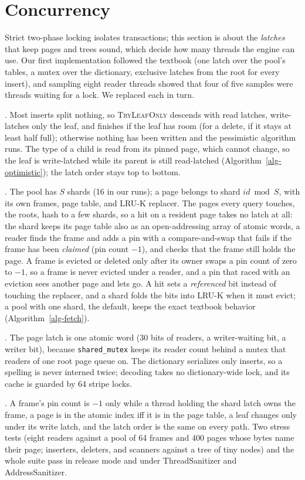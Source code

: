 \section{Concurrency}
\label{sec-conc}

Strict two-phase locking isolates transactions; this section is about the
\emph{latches} that keep pages and trees sound, which decide how many threads the
engine can use.
Our first implementation followed the textbook (one latch over the pool's
tables, a mutex over the dictionary, exclusive latches from the root for every
insert), and sampling eight reader threads showed that four of five samples were
threads waiting for a lock.
We replaced each in turn.

.
Most inserts split nothing, so \textsc{TryLeafOnly} descends with read
latches, write-latches only the leaf, and finishes if the leaf has room (for a
delete, if it stays at least half full); otherwise nothing has been written and
the pessimistic algorithm runs.
The type of a child is read from its pinned page, which cannot change, so the
leaf is write-latched while its parent is still read-latched
(Algorithm~\ref{alg-optimistic}); the latch order stays top to bottom.

.
The pool has $S$ shards (16 in our runs); a page belongs to shard $\mathit{id}
\bmod S$, with its own frames, page table, and LRU-K replacer.
The pages every query touches, the roots, hash to a few shards, so a hit on a
resident page takes no latch at all: the shard keeps its page table also as an
open-addressing array of atomic words, a reader finds the frame and adds a pin
with a compare-and-swap that fails if the frame has been \emph{claimed} (pin
count $-1$), and checks that the frame still holds the page.
A frame is evicted or deleted only after its owner swaps a pin count of zero to
$-1$, so a frame is never evicted under a reader, and a pin that raced with an
eviction sees another page and lets go.
A hit sets a \emph{referenced} bit instead of touching the replacer, and a shard
folds the bits into LRU-K when it must evict; a pool with one shard, the default,
keeps the exact textbook behavior (Algorithm~\ref{alg-fetch}).



.
The page latch is one atomic word (30 bits of readers, a writer-waiting bit, a
writer bit), because \texttt{shared\_mutex} keeps its reader count behind a
mutex that readers of one root page queue on.
The dictionary serializes only inserts, so a spelling is never interned twice;
decoding takes no dictionary-wide lock, and its cache is guarded by 64 stripe
locks.

.
A frame's pin count is $-1$ only while a thread holding the shard latch owns the
frame, a page is in the atomic index iff it is in the page table, a leaf changes
only under its write latch, and the latch order is the same on every path.
Two stress tests (eight readers against a pool of 64 frames and 400 pages whose
bytes name their page; inserters, deleters, and scanners against a tree of tiny
nodes) and the whole suite pass in release mode and under ThreadSanitizer and
AddressSanitizer.
